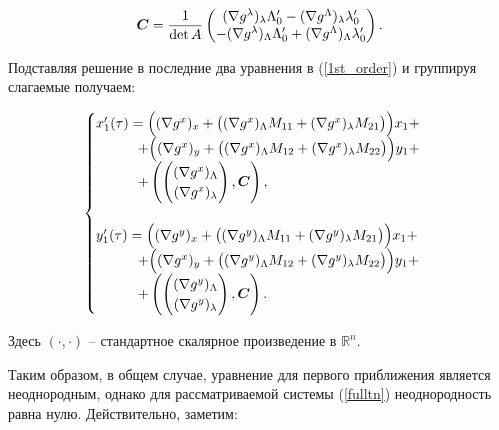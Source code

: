 \begin{enumerate}
$$\boldsymbol{C} = \frac{1}{\det A} \begin{pmatrix} (\nabla g^\lambda)_\lambda \Lambda_0' - (\nabla g^\Lambda)_\lambda \lambda_0' \\ -(\nabla g^\lambda)_\Lambda \Lambda_0' + (\nabla g^\Lambda)_\Lambda \lambda_0' \end{pmatrix}.$$

Подставляя решение в последние два уравнения в (\ref{1st_order}) и группируя слагаемые получаем:

\begin{equation}
    \begin{cases}
        x_1'(\tau) = 
            \Big( 
                (\nabla g^x)_x + \big( (\nabla g^x)_\Lambda M_{11} + (\nabla g^x)_\lambda M_{21} \big)
            \Big)x_1 +\\
            \quad \quad \quad + \Big(
                (\nabla g^x)_y + \big( (\nabla g^x)_\Lambda M_{12} + (\nabla g^x)_\lambda M_{22} \big)
            \Big)y_1 +\\
            \quad \quad \quad + \left( \begin{pmatrix} (\nabla g^x)_\Lambda \\ (\nabla g^x)_\lambda \end{pmatrix},\boldsymbol{C} \right), \\
            \\
        y_1'(\tau)=
            \Big(
                (\nabla g^y)_x + \big( (\nabla g^y)_\Lambda M_{11} + (\nabla g^y)_\lambda M_{21} \big)
            \Big)x_1 +\\
            \quad \quad \quad + \Big(
                (\nabla g^x)_y + \big( (\nabla g^y)_\Lambda M_{12} + (\nabla g^y)_\lambda M_{22} \big)
            \Big)y_1 +\\
            \quad \quad \quad + \left( \begin{pmatrix} (\nabla g^y)_\Lambda \\ (\nabla g^y)_\lambda \end{pmatrix},\boldsymbol{C} \right). \\
    \end{cases}
    \label{x1y1_eq}
\end{equation}

Здесь $(\cdot,\cdot)$ -- стандартное скалярное произведение в $\mathbb{R}^n$.

Таким образом, в общем случае, уравнение для первого приближения является неоднородным, однако для рассматриваемой системы (\ref{fulltn}) неоднородность равна нулю. Действительно, заметим:


\end{enumerate}

